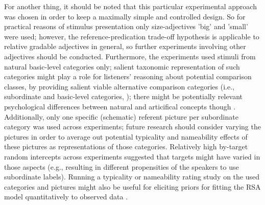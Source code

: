 For another thing, it should be noted that this particular experimental approach was chosen in order to keep a maximally simple and controlled design. So for practical reasons of stimulus presentation only size-adjectives 'big' and 'small' were used; however, the reference-predication trade-off hypothesis is applicable to relative gradable adjectives in general, so further experiments involving other adjectives should be conducted. 
Furthermore, the experiments used stimuli from natural basic-level categories only; salient taxonomic representation of such categories might play a role for listeners' reasoning about potential comparison classes, by providing salient viable alternative comparison categories (i.e., subordinate and basic-level categories, \textcite[cf.][]{rosch1976, tenenbaum2011grow}); there might be potentially relevant psychological differences between natural and articifical concepts though%
 \parencite{kalish2002gold}. 
Additionally, only one specific (schematic) referent picture per subordinate category was used across experiments; future research should consider varying the pictures in order to average out potential typicality and nameability effects of these pictures as representations of those categories. Relatively high by-target random intercepts across experiments suggested that targets might have varied in those aspects (e.g., resulting in different propensities of the speakers to use subordinate labels). Running a typicality or nameability rating study on the used categories and pictures might also be useful for eliciting priors for fitting the RSA model quantitatively to observed data \parencite{franke2016does}. %


